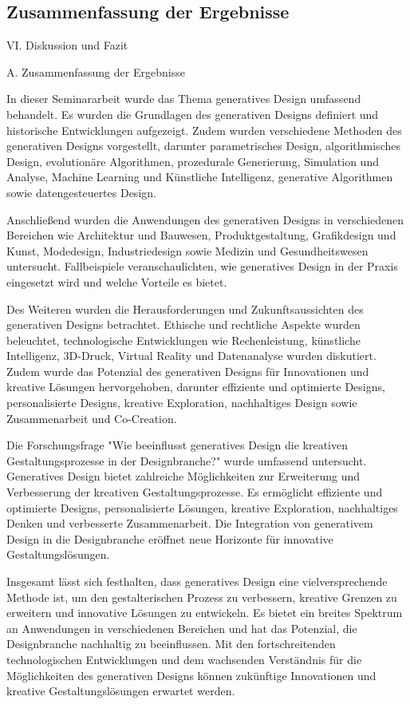 \subsection*{Zusammenfassung der Ergebnisse}
VI. Diskussion und Fazit

A. Zusammenfassung der Ergebnisse

In dieser Seminararbeit wurde das Thema generatives Design umfassend behandelt. Es wurden die Grundlagen des generativen Designs definiert und historische Entwicklungen aufgezeigt. Zudem wurden verschiedene Methoden des generativen Designs vorgestellt, darunter parametrisches Design, algorithmisches Design, evolutionäre Algorithmen, prozedurale Generierung, Simulation und Analyse, Machine Learning und Künstliche Intelligenz, generative Algorithmen sowie datengesteuertes Design.

Anschließend wurden die Anwendungen des generativen Designs in verschiedenen Bereichen wie Architektur und Bauwesen, Produktgestaltung, Grafikdesign und Kunst, Modedesign, Industriedesign sowie Medizin und Gesundheitswesen untersucht. Fallbeispiele veranschaulichten, wie generatives Design in der Praxis eingesetzt wird und welche Vorteile es bietet.

Des Weiteren wurden die Herausforderungen und Zukunftsaussichten des generativen Designs betrachtet. Ethische und rechtliche Aspekte wurden beleuchtet, technologische Entwicklungen wie Rechenleistung, künstliche Intelligenz, 3D-Druck, Virtual Reality und Datenanalyse wurden diskutiert. Zudem wurde das Potenzial des generativen Designs für Innovationen und kreative Lösungen hervorgehoben, darunter effiziente und optimierte Designs, personalisierte Designs, kreative Exploration, nachhaltiges Design sowie Zusammenarbeit und Co-Creation.

Die Forschungsfrage "Wie beeinflusst generatives Design die kreativen Gestaltungsprozesse in der Designbranche?" wurde umfassend untersucht. Generatives Design bietet zahlreiche Möglichkeiten zur Erweiterung und Verbesserung der kreativen Gestaltungsprozesse. Es ermöglicht effiziente und optimierte Designs, personalisierte Lösungen, kreative Exploration, nachhaltiges Denken und verbesserte Zusammenarbeit. Die Integration von generativem Design in die Designbranche eröffnet neue Horizonte für innovative Gestaltungslösungen.

Insgesamt lässt sich festhalten, dass generatives Design eine vielversprechende Methode ist, um den gestalterischen Prozess zu verbessern, kreative Grenzen zu erweitern und innovative Lösungen zu entwickeln. Es bietet ein breites Spektrum an Anwendungen in verschiedenen Bereichen und hat das Potenzial, die Designbranche nachhaltig zu beeinflussen. Mit den fortschreitenden technologischen Entwicklungen und dem wachsenden Verständnis für die Möglichkeiten des generativen Designs können zukünftige Innovationen und kreative Gestaltungslösungen erwartet werden.

